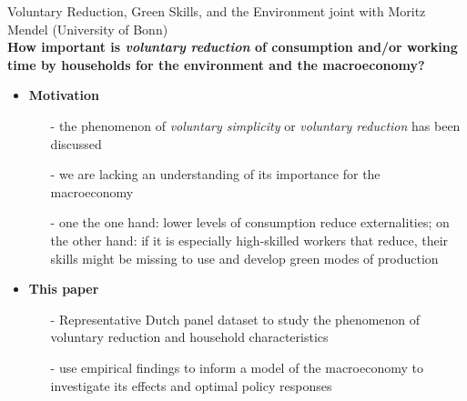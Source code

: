 \begin{frame}{Voluntary  Reduction, Green Skills, and the Environment}
		\vspace{-5mm}
	\hspace{-6mm}\footnotesize{joint with Moritz Mendel (University of Bonn)}\\
	
	
	\vspace{5mm}\textbf{\alert{How important is \textit{voluntary reduction} of consumption and/or working time by households for the environment and the macroeconomy? }}
	
\begin{itemize}
\item \textbf{Motivation}
\begin{itemize}
\item[-] the phenomenon of \textit{voluntary simplicity} or \textit{voluntary reduction} has been discussed
\item[-] we are lacking an understanding of its importance for the macroeconomy
\item[-] one the one hand: lower levels of consumption reduce externalities; on the other hand: if it is especially high-skilled workers that reduce, their skills might be missing to use and develop green modes of production
\end{itemize}
\item \textbf{This paper}
\begin{itemize}
	\item[-] Representative Dutch panel dataset to study the phenomenon of voluntary reduction and household characteristics
	\item[-] use empirical findings to inform a model of the macroeconomy to investigate its effects and optimal policy responses
\end{itemize}
\end{itemize}
\end{frame}


